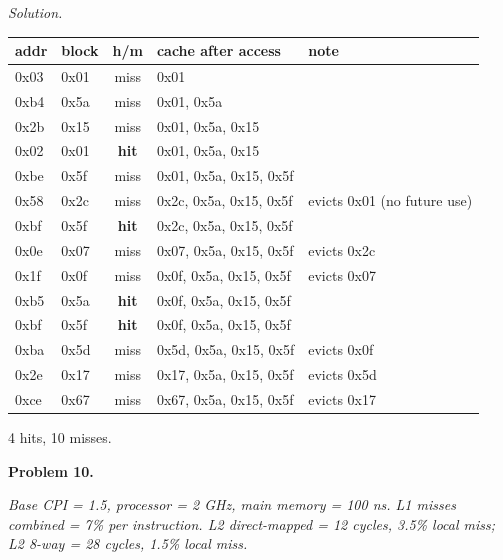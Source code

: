 \documentclass[12pt]{article}
\newcommand{\problem}[1]{\vspace{0.8em}\noindent\textbf{Problem #1.}\vspace{0.35em}}
\newenvironment{solution}{\par\noindent\textit{Solution.}\ }{\par\vspace{1.1em}}
\newcommand{\assigntext}[1]{\par\vspace{0.25em}\small\textit{#1}\par\vspace{0.35em}}
\begin{document}
\begin{solution}
\begin{center}\small
\begin{tabular}{@{}llcll@{}}\toprule
addr & block & h/m & cache after access & note \\\midrule
0x03 & 0x01 & miss & 0x01 & \\
0xb4 & 0x5a & miss & 0x01, 0x5a & \\
0x2b & 0x15 & miss & 0x01, 0x5a, 0x15 & \\
0x02 & 0x01 & \textbf{hit}  & 0x01, 0x5a, 0x15 & \\
0xbe & 0x5f & miss & 0x01, 0x5a, 0x15, 0x5f & \\
0x58 & 0x2c & miss & 0x2c, 0x5a, 0x15, 0x5f & evicts 0x01 (no future use) \\
0xbf & 0x5f & \textbf{hit}  & 0x2c, 0x5a, 0x15, 0x5f & \\
0x0e & 0x07 & miss & 0x07, 0x5a, 0x15, 0x5f & evicts 0x2c \\
0x1f & 0x0f & miss & 0x0f, 0x5a, 0x15, 0x5f & evicts 0x07 \\
0xb5 & 0x5a & \textbf{hit}  & 0x0f, 0x5a, 0x15, 0x5f & \\
0xbf & 0x5f & \textbf{hit}  & 0x0f, 0x5a, 0x15, 0x5f & \\
0xba & 0x5d & miss & 0x5d, 0x5a, 0x15, 0x5f & evicts 0x0f \\
0x2e & 0x17 & miss & 0x17, 0x5a, 0x15, 0x5f & evicts 0x5d \\
0xce & 0x67 & miss & 0x67, 0x5a, 0x15, 0x5f & evicts 0x17 \\
\bottomrule\end{tabular}\end{center}
4 hits, 10 misses.
\end{solution}

\problem{10}
\assigntext{Base CPI = 1.5, processor = 2 GHz, main memory = 100 ns. L1 misses combined = 7\% per instruction. L2 direct-mapped = 12 cycles, 3.5\% local miss; L2 8-way = 28 cycles, 1.5\% local miss.}
\end{document}
